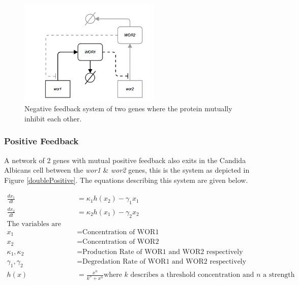 \documentclass[]{article}
\begin{document}
        \begin{figure}[h!]
        \centering
        \includegraphics[width=0.6\textwidth]{./figures/doubleNegative.png}
        \caption{Negative feedback system of two genes where the protein mutually inhibit each other.}
        \label{doubleNegative}
        \end{figure}
                 
            \subsubsection{Positive Feedback}
            A network of 2 genes with mutual positive feedback also exits in the Candida Albicans cell between the \textit{wor1} \& \textit{wor2} genes, this is the system as depicted in Figure \ref{doublePositive}. The equations describing this system are given below.
            
            \begin{align*}
                \frac{dx_1}{dt} &= \kappa_1 h(x_2) - \gamma_1 x_1 \\
                \frac{dx_2}{dt} &= \kappa_2 h(x_1) - \gamma_2 x_2 \\
                \text{The variables are denoted as:}&\\
                x_1 &= \text{Concentration of WOR1}\\
                x_2 &= \text{Concentration of WOR2}\\
                \kappa_1, \kappa_2 &= \text{Production Rate of WOR1 and WOR2 respectively}\\
                \gamma_1, \gamma_2 &= \text{Degredation Rate of WOR1 and WOR2 respectively}\\
                h(x) &= \frac{x^n}{k^n+x^n} \text{where $k$ describes a threshold concentration and $n$ a strength}
            \end{align*}
            
\end{document}
